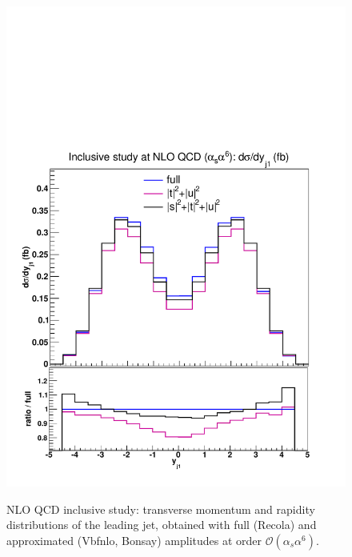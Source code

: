 \begin{figure}[hbt]
{\includegraphics[scale=0.35]{figures/scanfigures/yj1_nlo.pdf}}
\caption{NLO QCD inclusive study: transverse momentum and rapidity distributions of the leading jet, obtained with full ({\sc Recola}) and approximated ({\sc Vbfnlo, Bonsay}) amplitudes at order $\mathcal{O}(\alpha_s\alpha^6)$.} \label{fig:mjjdyjj_1d_2}
\end{figure}

